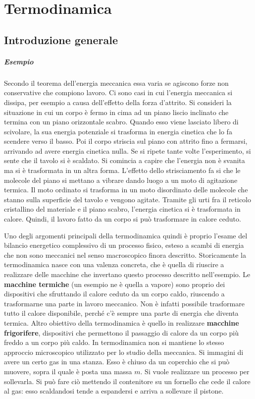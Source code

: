 \chapter{Termodinamica}

\section{Introduzione generale}

\paragraph{Esempio} Secondo il teorema dell'energia meccanica essa varia se agiscono forze non conservative che compiono lavoro. Ci sono casi in cui l'energia meccanica si dissipa, per esempio a causa dell'effetto della forza d'attrito. Si consideri la situazione in cui un corpo è fermo in cima ad un piano liscio inclinato che termina con un piano orizzontale scabro. Quando esso viene lasciato libero di scivolare, la sua energia potenziale si trasforma in energia cinetica che lo fa scendere verso il basso. Poi il corpo striscia sul piano con attrito fino a fermarsi, arrivando ad avere energia cinetica nulla. Se si ripete tante volte l'esperimento, si sente che il tavolo si è scaldato. Si comincia a capire che l'energia non è svanita ma si è trasformata in un altra forma. L'effetto dello strisciamento fa si che le molecole del piano si mettano a vibrare dando luogo a un moto di agitazione termica. Il moto ordinato si trasforma in un moto disordinato delle molecole che stanno sulla superficie del tavolo e vengono agitate.
Tramite gli urti fra il reticolo cristallino del materiale e il piano scabro, l'energia cinetica si è trasformata in calore. Quindi, il lavoro fatto da un corpo si può trasformare in calore ceduto.

Uno degli argomenti principali della termodinamica quindi è proprio l'esame del bilancio energetico complessivo di un processo fisico, esteso a scambi di energia che non sono meccanici nel senso macroscopico finora descritto.
Storicamente la termodinamica nasce con una valenza concreta, che è quella di riuscire a realizzare delle macchine che invertano questo processo descritto nell'esempio. Le \textbf{macchine termiche} (un esempio ne è quella a vapore) sono proprio dei dispositivi che sfruttando il calore ceduto da un corpo caldo, riuscendo a trasformarne una parte in lavoro meccanico. Non è infatti possibile trasformare tutto il calore disponibile, perché c'è sempre una parte di energia che diventa termica. Altro obiettivo della termodinamica è quello in realizzare \textbf{macchine frigorifere}, dispositivi che permettono il passaggio di calore da un corpo più freddo a un corpo più caldo.
In termodinamica non si mantiene lo stesso approccio microscopico utilizzato per lo studio della meccanica. Si immagini di avere un certo gas in una stanza. Esso è chiuso da un coperchio che si può muovere, sopra il quale è posta una massa $m$. Si vuole realizzare un processo per sollevarla. Si può fare ciò mettendo il contenitore su un fornello che cede il calore al gas: esso scaldandosi tende a espandersi e arriva a sollevare il pistone.

